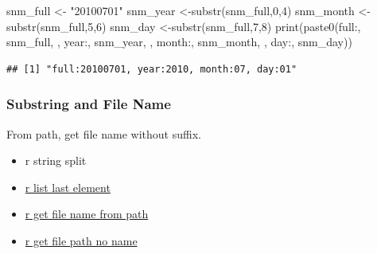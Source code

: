 \documentclass[
]{book}
\newenvironment{Shaded}{\begin{snugshade}}{\end{snugshade}}
\newcommand{\DecValTok}[1]{\textcolor[rgb]{0.00,0.00,0.81}{#1}}
\newcommand{\FunctionTok}[1]{\textcolor[rgb]{0.00,0.00,0.00}{#1}}
\newcommand{\NormalTok}[1]{#1}
\newcommand{\OtherTok}[1]{\textcolor[rgb]{0.56,0.35,0.01}{#1}}
\newcommand{\StringTok}[1]{\textcolor[rgb]{0.31,0.60,0.02}{#1}}
\providecommand{\tightlist}{%
  \setlength{\itemsep}{0pt}\setlength{\parskip}{0pt}}
\begin{document}
\begin{Shaded}
\begin{Highlighting}[]
\NormalTok{snm\_full }\OtherTok{\textless{}{-}} \StringTok{"20100701"}
\NormalTok{snm\_year }\OtherTok{\textless{}{-}}\FunctionTok{substr}\NormalTok{(snm\_full,}\DecValTok{0}\NormalTok{,}\DecValTok{4}\NormalTok{)}
\NormalTok{snm\_month }\OtherTok{\textless{}{-}}\FunctionTok{substr}\NormalTok{(snm\_full,}\DecValTok{5}\NormalTok{,}\DecValTok{6}\NormalTok{)}
\NormalTok{snm\_day }\OtherTok{\textless{}{-}}\FunctionTok{substr}\NormalTok{(snm\_full,}\DecValTok{7}\NormalTok{,}\DecValTok{8}\NormalTok{)}
\FunctionTok{print}\NormalTok{(}\FunctionTok{paste0}\NormalTok{(}\StringTok{\textquotesingle{}full:\textquotesingle{}}\NormalTok{, snm\_full, }
             \StringTok{\textquotesingle{}, year:\textquotesingle{}}\NormalTok{, snm\_year, }
             \StringTok{\textquotesingle{}, month:\textquotesingle{}}\NormalTok{, snm\_month,}
             \StringTok{\textquotesingle{}, day:\textquotesingle{}}\NormalTok{, snm\_day))}
\end{Highlighting}
\end{Shaded}

\begin{verbatim}
## [1] "full:20100701, year:2010, month:07, day:01"
\end{verbatim}

\hypertarget{substring-and-file-name}{%
\subsubsection{Substring and File Name}\label{substring-and-file-name}}

From path, get file name without suffix.

\begin{itemize}
\tightlist
\item
  r string split
\item
  \href{https://stackoverflow.com/a/83222/8280804}{r list last element}
\item
  \href{https://stackoverflow.com/a/29114007/8280804}{r get file name from path}
\item
  \href{https://stackoverflow.com/a/47189541/8280804}{r get file path no name}
\end{itemize}
\end{document}
